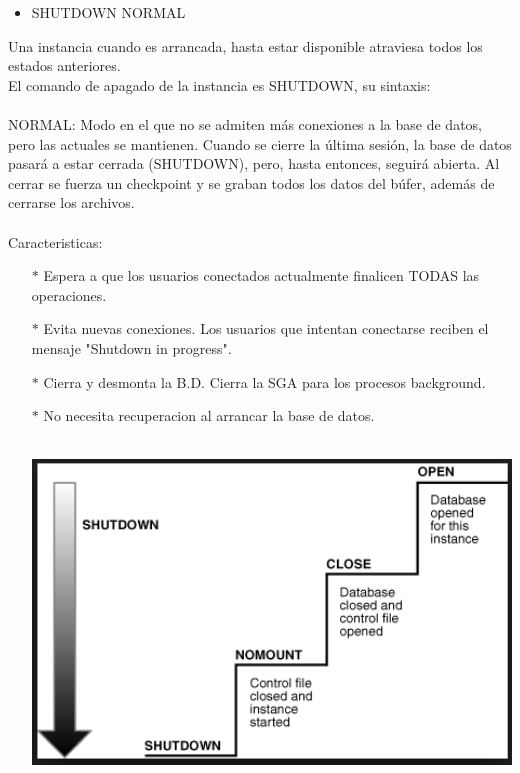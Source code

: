 \begin{itemize}
	\item SHUTDOWN NORMAL   
\end{itemize}
\begin{adjustwidth}{0.40in}{0.0in}
	Una instancia cuando es arrancada, hasta estar disponible atraviesa todos los estados anteriores.\\ 
	El comando de apagado de la instancia es SHUTDOWN, su sintaxis:\\ \\
	NORMAL: Modo en el que no se admiten más conexiones a la base de datos, pero las actuales se mantienen. Cuando se cierre la última sesión, la base de datos pasará a estar cerrada (SHUTDOWN), pero, hasta entonces, seguirá abierta. Al cerrar se fuerza un checkpoint y se graban todos los datos del búfer, además de cerrarse los archivos.\\ \\
	Caracteristicas:
	\begin{itemize}
		\item[$*$] Espera a que los usuarios conectados actualmente finalicen TODAS las operaciones.
		\item[$*$] Evita nuevas conexiones. Los usuarios que intentan conectarse reciben el mensaje "Shutdown in progress".
		\item[$*$] Cierra y desmonta la B.D. Cierra la SGA para los procesos background.
		\item[$*$] No necesita recuperacion al arrancar la base de datos.\\ \\
	\begin{center}
		\includegraphics[width=15.3cm]{./Imagenes/shutdown}
	\end{center}
	\end{itemize}	
\end{adjustwidth}

\vspace{\baselineskip}
\vspace{\baselineskip}
